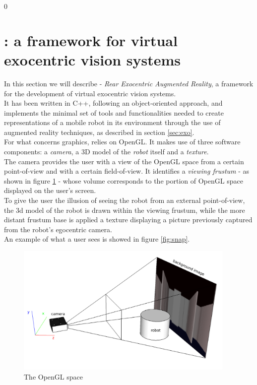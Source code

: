 \setcounter{figure}{0}
\setcounter{table}{0}
\setcounter{lstlisting} {0}

\section{\framework{}: a framework for virtual exocentric vision systems}
\label{sec:rear}

In this section we will describe \framework{} - 
\textit{Rear Exocentric Augmented Reality}, a framework 
for the development of virtual exocentric vision systems.
\\
It has been written in C++, following an object-oriented 
approach, and implements the minimal set of tools and functionalities 
needed to create representations of a mobile robot in its environment 
through the use of augmented reality techniques, as described in 
section \ref{sec:exo}.
\\
For what concerns graphics, \framework{} relies on OpenGL.
It makes use of three software components: a \textit{camera}, 
a 3D model of the \textit{robot} itself and a \textit{texture}.
\\
The camera provides the user with a view of the OpenGL space 
from a certain point-of-view and with a certain field-of-view. 
It identifies a \textit{viewing frustum} - as shown in figure 
\ref{fig:openglspace} - whose volume corresponds to the 
portion of OpenGL space displayed on the user's screen.
\\
To give the user the illusion of seeing the robot from an 
external point-of-view, the 3d model of the robot is drawn 
within the viewing frustum, while the more distant frustum base 
is applied a texture displaying a picture previously 
captured from the robot's egocentric camera.
\\
An example of what a user sees is showed in figure \ref{fig:snap}.

\begin{figure}[!h]
  \begin{center}
    \includegraphics[width=300pt]{img/camera_frustum_scheme.png}
    \caption{The OpenGL space}
    \label{fig:openglspace}
  \end{center}
\end{figure}

